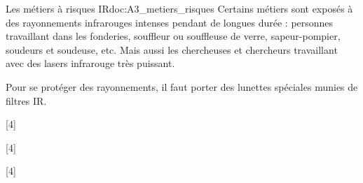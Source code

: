 \begin{doc}{Les métiers à risques IR}{doc:A3_metiers_risques}
  Certains métiers sont exposés à des rayonnements infrarouges intenses pendant de longues durée : personnes travaillant dans les fonderies, souffleur ou souffleuse de verre, sapeur-pompier, soudeurs et soudeuse, etc.
  Mais aussi les chercheuses et chercheurs travaillant avec des lasers infrarouge très puissant.

  Pour se protéger des rayonnements, il faut porter des lunettes spéciales munies de filtres IR.
\end{doc}


[4]

\newpage
{}[4]

[4]
